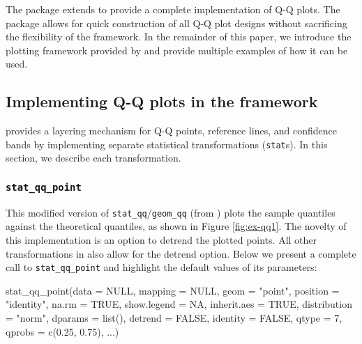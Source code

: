 The  package extends  to provide a complete
implementation of Q-Q plots. The package allows for quick construction
of all Q-Q plot designs without sacrificing the flexibility of the
 framework. In the remainder of this paper, we introduce
the plotting framework provided by  and provide multiple
examples of how it can be used.

\subsection{\texorpdfstring{Implementing Q-Q plots in the 
framework}{Implementing Q-Q plots in the  framework}}\label{implementing-q-q-plots-in-the-framework}

\label{sec:implementing}

 provides a  layering mechanism for Q-Q
points, reference lines, and confidence bands by implementing separate
statistical transformations (\texttt{stat}s). In this section, we
describe each transformation.

\subsubsection{\texorpdfstring{\texttt{stat\_qq\_point}}{stat\_qq\_point}}\label{stat_qq_point}

This modified version of \texttt{stat\_qq}/\texttt{geom\_qq} (from
) plots the sample quantiles against the theoretical
quantiles, as shown in Figure \ref{fig:ex-qq1}. The novelty of this
implementation is an option to detrend the plotted points. All other
transformations in  also allow for the detrend option.
Below we present a complete call to \texttt{stat\_qq\_point} and
highlight the default values of its parameters:

\begin{Schunk}
\begin{Sinput}
stat_qq_point(data = NULL,
              mapping = NULL,
              geom = "point",
              position = "identity",
              na.rm = TRUE,
              show.legend = NA,
              inherit.aes = TRUE,
              distribution = "norm",
              dparams = list(),
              detrend = FALSE,
              identity = FALSE,
              qtype = 7,
              qprobs = c(0.25, 0.75),
              ...)
\end{Sinput}
\end{Schunk}

